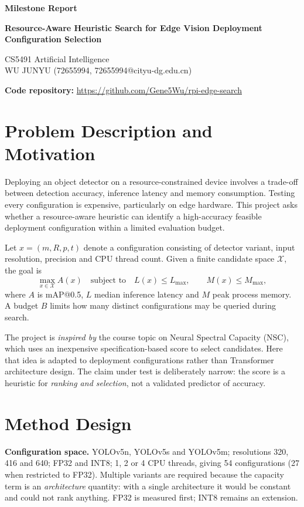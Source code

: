 \documentclass[12pt,a4paper]{article}
\begin{document}
\begin{center}
{\Large\bfseries Milestone Report\par}
\vspace{0.3em}
{\large\bfseries Resource-Aware Heuristic Search for Edge Vision Deployment Configuration Selection\par}
\vspace{0.3em}
CS5491 Artificial Intelligence\\
WU JUNYU (72655994, 72655994@cityu-dg.edu.cn)
\end{center}

\textbf{Code repository:} \url{https://github.com/Gene5Wu/rpi-edge-search}

\section{Problem Description and Motivation}

Deploying an object detector on a resource-constrained device involves a trade-off
between detection accuracy, inference latency and memory consumption. Testing every
configuration is expensive, particularly on edge hardware. This project asks whether a
resource-aware heuristic can identify a high-accuracy feasible deployment configuration
within a limited evaluation budget.

Let \(x=(m,R,p,t)\) denote a configuration consisting of detector variant, input
resolution, precision and CPU thread count. Given a finite candidate space
\(\mathcal X\), the goal is
\[
\max_{x\in\mathcal X} A(x)\quad\text{subject to}\quad L(x)\le L_{\max},\qquad M(x)\le M_{\max},
\]
where \(A\) is mAP@0.5, \(L\) median inference latency and \(M\) peak process memory. A
budget \(B\) limits how many distinct configurations may be queried during search.

The project is \emph{inspired by} the course topic on Neural Spectral Capacity (NSC),
which uses an inexpensive specification-based score to select candidates. Here that idea
is adapted to deployment configurations rather than Transformer architecture design. The
claim under test is deliberately narrow: the score is a heuristic for \emph{ranking and
selection}, not a validated predictor of accuracy.

\section{Method Design}

\textbf{Configuration space.} YOLOv5n, YOLOv5s and YOLOv5m; resolutions 320, 416 and
640; FP32 and INT8; 1, 2 or 4 CPU threads, giving 54 configurations (27 when restricted
to FP32). Multiple variants are required because the capacity term is an
\emph{architecture} quantity: with a single architecture it would be constant and could
not rank anything. FP32 is measured first; INT8 remains an extension.
\end{document}

